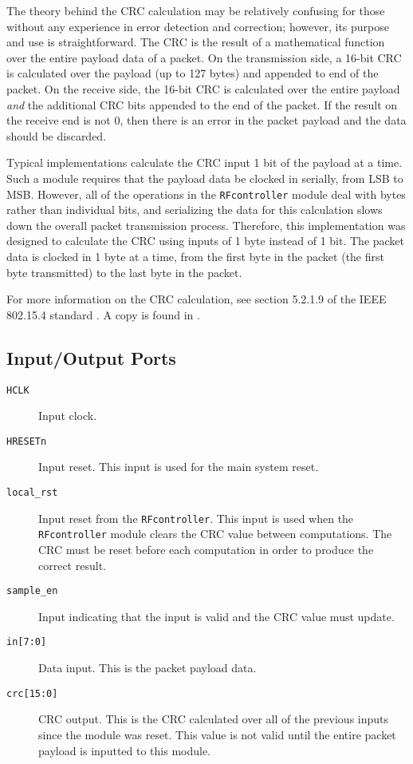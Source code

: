 The theory behind the CRC calculation may be relatively confusing for those without any experience in error detection and correction; however, its purpose and use is straightforward. The CRC is the result of a mathematical function over the entire payload data of a packet. On the transmission side, a 16-bit CRC is calculated over the payload (up to 127 bytes) and appended to end of the packet. On the receive side, the 16-bit CRC is calculated over the entire payload \textit{and} the additional CRC bits appended to the end of the packet. If the result on the receive end is not 0, then there is an error in the packet payload and the data should be discarded. %

Typical implementations calculate the CRC input 1 bit of the payload at a time. Such a module requires that the payload data be clocked in serially, from LSB to MSB. However, all of the operations in the \texttt{RFcontroller} module deal with bytes rather than individual bits, and serializing the data for this calculation slows down the overall packet transmission process. Therefore, this implementation was designed to calculate the CRC using inputs of 1 byte instead of 1 bit. The packet data is clocked in 1 byte at a time, from the first byte in the packet (the first byte transmitted) to the last byte in the packet.

For more information on the CRC calculation, see section 5.2.1.9 of the IEEE 802.15.4 standard \cite{15-4-standard}. A copy is found in .

\subsection{Input/Output Ports}
\begin{description}
	\item[\texttt{HCLK}] Input clock.
	\item[\texttt{HRESETn}] Input reset. This input is used for the main system reset.
	\item[\texttt{local\_rst}] Input reset from the \texttt{RFcontroller}. This input is used when the \texttt{RFcon\-t\-roller} module clears the CRC value between computations. The CRC must be reset before each computation in order to produce the correct result.
	\item[\texttt{sample\_en}] Input indicating that the input is valid and the CRC value must update.
	\item[\texttt{in[7:0]}] Data input. This is the packet payload data.
	\item[\texttt{crc[15:0]}] CRC output. This is the CRC calculated over all of the previous inputs since the module was reset. This value is not valid until the entire packet payload is inputted to this module.
\end{description}

